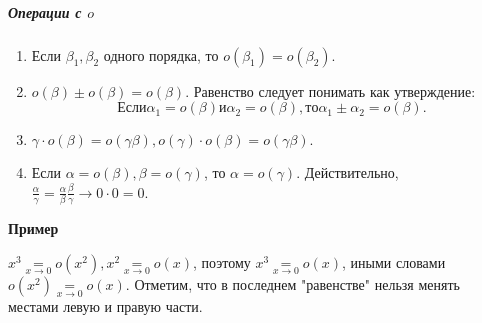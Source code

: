 \documentclass{article}
\begin{document}
\subparagraph{Операции с $o$}
\begin{enumerate}
  \item Если $\beta_1, \beta_2$ одного порядка, то $o(\beta_1) = o(\beta_2)$.
  \item $o(\beta) \pm o(\beta) = o(\beta)$.
  Равенство следует понимать как утверждение:
  $$Если \alpha_1 = o(\beta) и \alpha_2 = o(\beta), то \alpha_1 \pm \alpha_2 = o(\beta).$$
  \item $\gamma \cdot o(\beta) = o(\gamma \beta), o(\gamma) \cdot o(\beta) = o(\gamma \beta).$
  \item Если $\alpha = o(\beta), \beta = o(\gamma)$, то $\alpha = o(\gamma)$.
  Действительно, $\frac{\alpha}{\gamma} = \frac{\alpha}{\beta} \frac{\beta}{\gamma} \rightarrow 0 \cdot 0 = 0$.
\end{enumerate}
\par\medskip \textbf{Пример}\par $x^3 \underset{x \rightarrow 0}{=} o(x^2), x^2 \underset{x \rightarrow 0}{=} o(x)$, поэтому $x^3 \underset{x \rightarrow 0}{=} o(x)$, иными словами $o(x^2) \underset{x \rightarrow 0}{=} o(x)$. Отметим, что в последнем "равенстве" нельзя менять местами левую и правую части.
\end{document}
